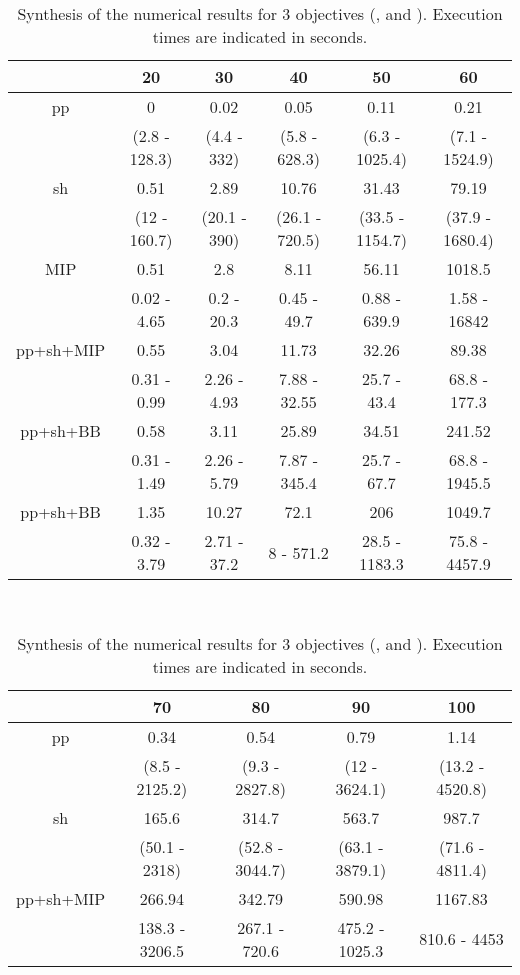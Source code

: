 \documentclass[final,3p,times]{elsarticle}
\begin{document}
\begin{table}[!h]
  \begin{center}
{\small \begin{tabular}{|c|ccccc|}    \hline
      \rule[1pt]{0pt}{13pt} 
    & 20&30&40&50&60\\
    \hline
    pp  &0&0.02&0.05&0.11&0.21\\
    	 &(2.8 - 128.3)&(4.4 - 332)&(5.8 - 628.3)&(6.3 - 1025.4)&(7.1 - 1524.9)\\
    sh&0.51&2.89&10.76&31.43&79.19\\
         &(12 - 160.7)&(20.1 - 390)&(26.1 - 720.5)&(33.5 - 1154.7)&(37.9 - 1680.4)\\
   \hline
 MIP&0.51&2.8&8.11&56.11&1018.5\\
      &0.02 - 4.65&0.2 - 20.3&0.45 - 49.7&0.88 - 639.9&1.58
      - 16842\\  
pp+sh+MIP&0.55&3.04&11.73&32.26&89.38\\
   &0.31 - 0.99&2.26 - 4.93&7.88 - 32.55&25.7 - 43.4&68.8
   - 177.3\\ 
pp+sh+BB&0.58&3.11&25.89&34.51&241.52\\
     &0.31 - 1.49&2.26 - 5.79&7.87 - 345.4&25.7 - 67.7&68.8 - 1945.5\\
pp+sh+BB&1.35&10.27&72.1&206&1049.7\\
    &0.32 - 3.79&2.71 - 37.2&8 - 571.2&28.5 - 1183.3&75.8 - 4457.9\\
  \hline
    \end{tabular}\\ [2ex]
\begin{tabular}{|c|cccc|}   \hline
 \rule[1pt]{0pt}{13pt} 
   & 70&80&90&100\\
  \hline
  pp & 0.34&0.54&0.79&1.14\\
    &(8.5 - 2125.2)&(9.3 - 2827.8)&(12 - 3624.1)&(13.2 - 4520.8)\\
  sh&165.6&314.7&563.7&987.7\\
  &(50.1 - 2318)&(52.8 - 3044.7)&(63.1 - 3879.1)&(71.6 - 4811.4)\\
  \hline
 pp+sh+MIP&266.94&342.79&590.98&1167.83\\
 &138.3 - 3206.5&267.1 - 720.6&475.2 - 1025.3&810.6 - 4453\\
\hline
\end{tabular}
}
\end{center}
\caption{\label{tabPL1} Synthesis of the numerical results for 3 objectives (,  and ). Execution times are indicated in seconds.
}
\end{table}
\end{document}
